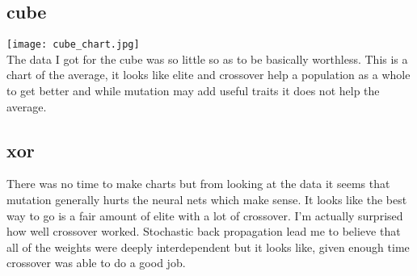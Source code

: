 \documentclass{article}
\begin{document}
\subsection{cube}
\texttt{[image: cube\_chart.jpg]}\\
The data I got for the cube was so little so as to be basically worthless. This is a chart of the average, it looks like elite and crossover help
a population as a whole to get better and while mutation may add useful traits it does not help the average.

\subsection{xor}
There was no time to make charts but from looking at the data it seems that mutation generally hurts the neural nets which make sense. It looks
like the best way to go is a fair amount of elite with a lot of crossover. I'm actually surprised how well crossover worked. Stochastic back
propagation lead me to believe that all of the weights were deeply interdependent but it looks like, given enough time crossover was able to do a
good job.
\end{document}
